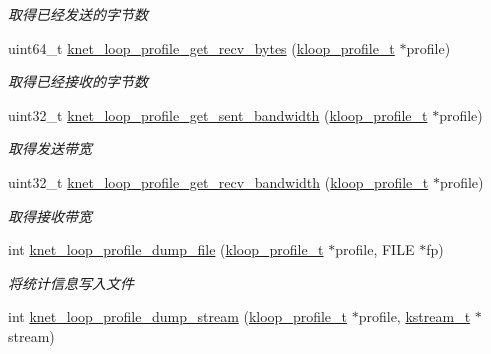 \begin{DoxyCompactItemize}
\begin{DoxyCompactList}\small\item\em 取得已经发送的字节数 \end{DoxyCompactList}\item 
uint64\+\_\+t \hyperlink{a00087_a1ac76d26570c5973ca054d5d2be07596_a1ac76d26570c5973ca054d5d2be07596}{knet\+\_\+loop\+\_\+profile\+\_\+get\+\_\+recv\+\_\+bytes} (\hyperlink{a00056_ab75a5c23099a6118c469ed160b277f28_ab75a5c23099a6118c469ed160b277f28}{kloop\+\_\+profile\+\_\+t} $\ast$profile)
\begin{DoxyCompactList}\small\item\em 取得已经接收的字节数 \end{DoxyCompactList}\item 
uint32\+\_\+t \hyperlink{a00087_a61bab9d3f25b772c11067d7ad48e5591_a61bab9d3f25b772c11067d7ad48e5591}{knet\+\_\+loop\+\_\+profile\+\_\+get\+\_\+sent\+\_\+bandwidth} (\hyperlink{a00056_ab75a5c23099a6118c469ed160b277f28_ab75a5c23099a6118c469ed160b277f28}{kloop\+\_\+profile\+\_\+t} $\ast$profile)
\begin{DoxyCompactList}\small\item\em 取得发送带宽 \end{DoxyCompactList}\item 
uint32\+\_\+t \hyperlink{a00087_a925853b256684e4d935f28d4c73a4832_a925853b256684e4d935f28d4c73a4832}{knet\+\_\+loop\+\_\+profile\+\_\+get\+\_\+recv\+\_\+bandwidth} (\hyperlink{a00056_ab75a5c23099a6118c469ed160b277f28_ab75a5c23099a6118c469ed160b277f28}{kloop\+\_\+profile\+\_\+t} $\ast$profile)
\begin{DoxyCompactList}\small\item\em 取得接收带宽 \end{DoxyCompactList}\item 
int \hyperlink{a00087_ada601f1836bdb78ccd50be447559a101_ada601f1836bdb78ccd50be447559a101}{knet\+\_\+loop\+\_\+profile\+\_\+dump\+\_\+file} (\hyperlink{a00056_ab75a5c23099a6118c469ed160b277f28_ab75a5c23099a6118c469ed160b277f28}{kloop\+\_\+profile\+\_\+t} $\ast$profile, F\+I\+L\+E $\ast$fp)
\begin{DoxyCompactList}\small\item\em 将统计信息写入文件 \end{DoxyCompactList}\item 
int \hyperlink{a00087_a256be2a18ebf141d93f95cdce1975a9e_a256be2a18ebf141d93f95cdce1975a9e}{knet\+\_\+loop\+\_\+profile\+\_\+dump\+\_\+stream} (\hyperlink{a00056_ab75a5c23099a6118c469ed160b277f28_ab75a5c23099a6118c469ed160b277f28}{kloop\+\_\+profile\+\_\+t} $\ast$profile, \hyperlink{a00056_acc208c4c40c875eebbfef88f00fffacf_acc208c4c40c875eebbfef88f00fffacf}{kstream\+\_\+t} $\ast$stream)

\end{DoxyCompactItemize}
